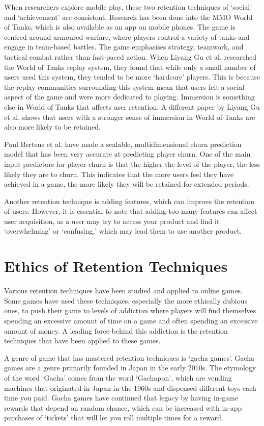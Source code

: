 When researchers explore mobile play, these two retention techniques of ‘social’ and ‘achievement’ are consistent. Research has been done into the MMO World of Tanks, which is also available as an app on mobile phones. The game is centred around armoured warfare, where players control a variety of tanks and engage in team-based battles. The game emphasises strategy, teamwork, and tactical combat rather than fast-paced action. When Liyang Gu et al. researched the World of Tanks replay system,\cite{Gu2021} they found that while only a small number of users used this system, they tended to be more ‘hardcore’ players. This is because the replay communities surrounding this system mean that users felt a social aspect of the game and were more dedicated to playing. Immersion is something else in World of Tanks that affects user retention. A different paper by Liyang Gu et al. shows that users with a stronger sense of immersion in World of Tanks are also more likely to be retained.\cite{Gu2018} 

Paul Bertens et al. have made a scalable, multidimensional churn prediction model that has been very accurate at predicting player churn.\cite{Bertens2017} One of the main input predictors for player churn is that the higher the level of the player, the less likely they are to churn. This indicates that the more users feel they have achieved in a game, the more likely they will be retained for extended periods.\cite{Bertens2017}

Another retention technique is adding features, which can improve the retention of users. However, it is essential to note that adding too many features can affect user acquisition, as a user may try to access your product and find it ‘overwhelming’ or ‘confusing,’ which may lead them to use another product.\cite{Hamilton2017}


\section{Ethics of Retention Techniques}
Various retention techniques have been studied and applied to online games. Some games have used these techniques, especially the more ethically dubious ones, to push their game to levels of addiction where players will find themselves spending an excessive amount of time on a game and often spending an excessive amount of money. A leading force behind this addiction is the retention techniques that have been applied to these games.\cite{Bernik2023}

A genre of game that has mastered retention techniques is ‘gacha games’. Gacha games are a genre primarily founded in Japan in the early 2010s. The etymology of the word ‘Gacha’ comes from the word ‘Gachapon', which are vending machines that originated in Japan in the 1960s and dispensed different toys each time you paid.\cite{Bernik2023} Gacha games have continued that legacy by having in-game rewards that depend on random chance, which can be increased with in-app purchases of ‘tickets’ that will let you roll multiple times for a reward.\cite{Bernik2023}

